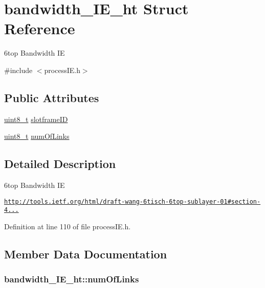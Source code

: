 \hypertarget{structbandwidth___i_e__ht}{}\section{bandwidth\+\_\+\+I\+E\+\_\+ht Struct Reference}
\label{structbandwidth___i_e__ht}


6top Bandwidth IE  




{\ttfamily \#include $<$process\+I\+E.\+h$>$}

\subsection*{Public Attributes}
\begin{DoxyCompactItemize}
\item 
\hyperlink{_p_e___types_8h_aba7bc1797add20fe3efdf37ced1182c5}{uint8\+\_\+t} \hyperlink{structbandwidth___i_e__ht_a2ebd01b0901f892821116601a32c6dff}{slotframe\+ID}
\item 
\hyperlink{_p_e___types_8h_aba7bc1797add20fe3efdf37ced1182c5}{uint8\+\_\+t} \hyperlink{structbandwidth___i_e__ht_a14a51330ae5fd9c37fc8b2d447a4bc8d}{num\+Of\+Links}
\end{DoxyCompactItemize}


\subsection{Detailed Description}
6top Bandwidth IE 

\href{http://tools.ietf.org/html/draft-wang-6tisch-6top-sublayer-01#section-4.1.1.6}{\tt http\+://tools.\+ietf.\+org/html/draft-\/wang-\/6tisch-\/6top-\/sublayer-\/01\#section-\/4...} 

Definition at line 110 of file process\+I\+E.\+h.



\subsection{Member Data Documentation}
\subsubsection[{\texorpdfstring{num\+Of\+Links}{numOfLinks}}]{ bandwidth\+\_\+\+I\+E\+\_\+ht\+::num\+Of\+Links}\hypertarget{structbandwidth___i_e__ht_a14a51330ae5fd9c37fc8b2d447a4bc8d}{}\label{structbandwidth___i_e__ht_a14a51330ae5fd9c37fc8b2d447a4bc8d}


